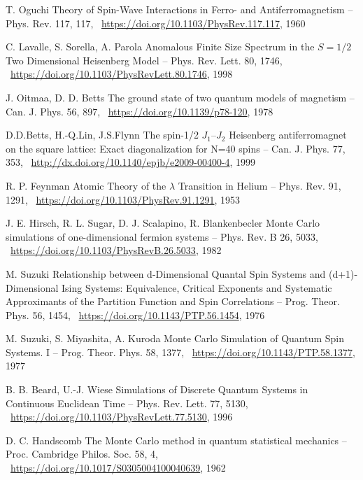 \documentclass[11pt]{article}
\begin{document}
\begin{thebibliography}{3}
T. Oguchi Theory of Spin-Wave Interactions in Ferro- and Antiferromagnetism -- Phys. Rev. 117, 117,  ~\url{https://doi.org/10.1103/PhysRev.117.117}, 1960

 C. Lavalle, S. Sorella, A. Parola Anomalous Finite Size Spectrum in the $S=1/2$ Two Dimensional Heisenberg Model -- Phys. Rev. Lett. 80, 1746,  ~\url{https://doi.org/10.1103/PhysRevLett.80.1746}, 1998

J. Oitmaa, D. D. Betts The ground state of two quantum models of magnetism -- Can. J. Phys. 56, 897,  ~\url{https://doi.org/10.1139/p78-120}, 1978


D.D.Betts, H.-Q.Lin, J.S.Flynn The spin-1/2 $J_1–J_2$ Heisenberg antiferromagnet on the square lattice: Exact diagonalization for N=40 spins -- Can. J. Phys. 77, 353,  ~\url{http://dx.doi.org/10.1140/epjb/e2009-00400-4}, 1999

R. P. Feynman Atomic Theory of the $\lambda$ Transition in Helium -- Phys. Rev. 91, 1291,  ~\url{https://doi.org/10.1103/PhysRev.91.1291}, 1953

J. E. Hirsch, R. L. Sugar, D. J. Scalapino, R. Blankenbecler Monte Carlo simulations of one-dimensional fermion systems -- Phys. Rev. B 26, 5033,  ~\url{https://doi.org/10.1103/PhysRevB.26.5033}, 1982

M. Suzuki Relationship between d-Dimensional Quantal Spin Systems and (d+1)-Dimensional Ising Systems: Equivalence, Critical Exponents and Systematic Approximants of the Partition Function and Spin Correlations -- Prog. Theor. Phys. 56, 1454,  ~\url{https://doi.org/10.1143/PTP.56.1454}, 1976

M. Suzuki, S. Miyashita, A. Kuroda Monte Carlo Simulation of Quantum Spin Systems. I -- Prog. Theor. Phys. 58, 1377,  ~\url{https://doi.org/10.1143/PTP.58.1377}, 1977

B. B. Beard, U.-J. Wiese Simulations of Discrete Quantum Systems in Continuous Euclidean Time -- Phys. Rev. Lett. 77, 5130,  ~\url{https://doi.org/10.1103/PhysRevLett.77.5130}, 1996

D. C. Handscomb The Monte Carlo method in quantum statistical mechanics -- Proc. Cambridge Philos. Soc. 58, 4,  ~\url{https://doi.org/10.1017/S0305004100040639}, 1962


\end{thebibliography}
\end{document}
